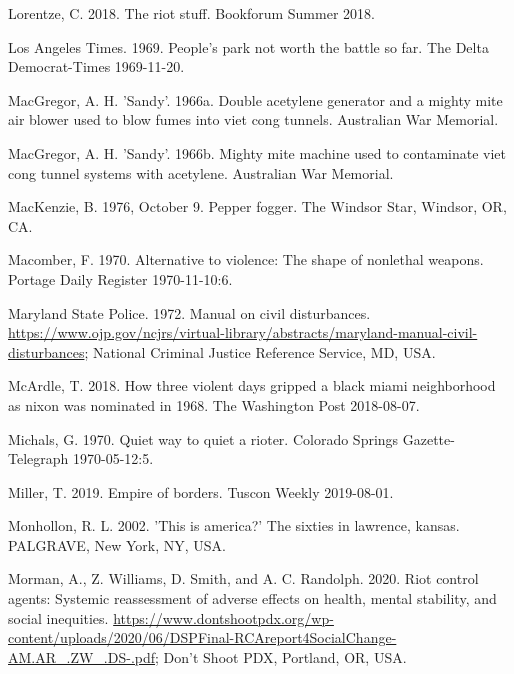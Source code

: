 \documentclass[
  11pt,
]{krantz}
\newlength{\cslhangindent}
\newlength{\cslentryspacingunit} %
\newenvironment{CSLReferences}[2] %
 {%
  \setlength{\parindent}{0pt}
  \ifodd #1
  \let\oldpar\par
  \def\par{\hangindent=\cslhangindent\oldpar}
  \fi
  \setlength{\parskip}{#2\cslentryspacingunit}
 }%
 {}
\begin{document}
\begin{CSLReferences}{1}{0}
\leavevmode{}%
Lorentze, C. 2018. The riot stuff. Bookforum Summer 2018.

\leavevmode{}%
Los Angeles Times. 1969. People's park not worth the battle so far. The Delta Democrat-Times 1969-11-20.

\leavevmode{}%
MacGregor, A. H. 'Sandy'. 1966a. Double acetylene generator and a mighty mite air blower used to blow fumes into viet cong tunnels. Australian War Memorial.

\leavevmode{}%
MacGregor, A. H. 'Sandy'. 1966b. Mighty mite machine used to contaminate viet cong tunnel systems with acetylene. Australian War Memorial.

\leavevmode{}%
MacKenzie, B. 1976, October 9. Pepper fogger. The Windsor Star, Windsor, OR, CA.

\leavevmode{}%
Macomber, F. 1970. Alternative to violence: The shape of nonlethal weapons. Portage Daily Register 1970-11-10:6.

\leavevmode{}%
Maryland State Police. 1972. Manual on civil disturbances. \url{https://www.ojp.gov/ncjrs/virtual-library/abstracts/maryland-manual-civil-disturbances}; National Criminal Justice Reference Service, MD, USA.

\leavevmode{}%
McArdle, T. 2018. How three violent days gripped a black miami neighborhood as nixon was nominated in 1968. The Washington Post 2018-08-07.

\leavevmode{}%
Michals, G. 1970. Quiet way to quiet a rioter. Colorado Springs Gazette-Telegraph 1970-05-12:5.

\leavevmode{}%
Miller, T. 2019. Empire of borders. Tuscon Weekly 2019-08-01.

\leavevmode{}%
Monhollon, R. L. 2002. 'This is america?' The sixties in lawrence, kansas. PALGRAVE, New York, NY, USA.

\leavevmode{}%
Morman, A., Z. Williams, D. Smith, and A. C. Randolph. 2020. Riot control agents: Systemic reassessment of adverse effects on health, mental stability, and social inequities. \url{https://www.dontshootpdx.org/wp-content/uploads/2020/06/DSPFinal-RCAreport4SocialChange-AM.AR_.ZW_.DS-.pdf}; Don't Shoot PDX, Portland, OR, USA.


\end{CSLReferences}
\end{document}
